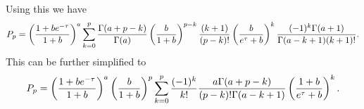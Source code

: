 Using this we have
\begin{equation}
  \small
  P_p = \left( {1 + b e^{-\tau} \over 1 + b} \right)^a
  \sum_{k=0}^p {\Gamma (a + p - k) \over \Gamma(a)}
  \left( {b \over 1 + b} \right)^{p - k}
  {(k + 1) \over (p - k)!} \left( b \over e^\tau + b \right)^k
  {(-1)^k \Gamma(a + 1) \over \Gamma(a - k + 1) (k + 1)!}.
\end{equation}
This can be further simplified to
\begin{equation}
  P_p = \left( {1 + b e^{-\tau} \over 1 + b} \right)^a
  \left( {b \over 1 + b} \right)^p
  \sum_{k=0}^p {(-1)^k \over k!}
  {a \Gamma(a + p - k) \over (p - k)! \Gamma(a - k + 1)}
  \left( {1 + b \over e^\tau + b} \right)^k.
\end{equation}
